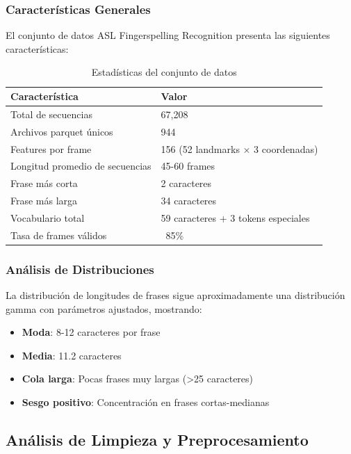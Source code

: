 \documentclass[12pt,a4paper]{article}
\begin{document}
\subsubsection{Características Generales}

El conjunto de datos ASL Fingerspelling Recognition presenta las siguientes características:

\begin{table}[H]
\centering
\caption{Estadísticas del conjunto de datos}
\begin{tabular}{@{}ll@{}}
\toprule
\textbf{Característica} & \textbf{Valor} \\
\midrule
Total de secuencias & 67,208 \\
Archivos parquet únicos & 944 \\
Features por frame & 156 (52 landmarks × 3 coordenadas) \\
Longitud promedio de secuencias & 45-60 frames \\
Frase más corta & 2 caracteres \\
Frase más larga & 34 caracteres \\
Vocabulario total & 59 caracteres + 3 tokens especiales \\
Tasa de frames válidos & ~85\% \\
\bottomrule
\end{tabular}
\end{table}

\subsubsection{Análisis de Distribuciones}

La distribución de longitudes de frases sigue aproximadamente una distribución gamma con parámetros ajustados, mostrando:

\begin{itemize}
    \item \textbf{Moda}: 8-12 caracteres por frase
    \item \textbf{Media}: 11.2 caracteres
    \item \textbf{Cola larga}: Pocas frases muy largas (>25 caracteres)
    \item \textbf{Sesgo positivo}: Concentración en frases cortas-medianas
\end{itemize}

\subsection{Análisis de Limpieza y Preprocesamiento}
\end{document}
